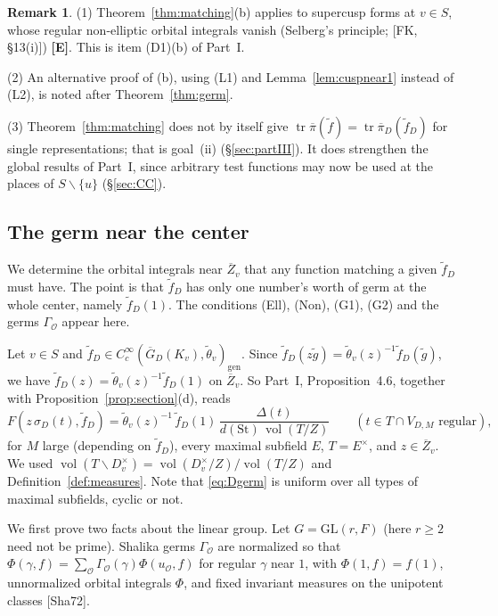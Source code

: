 \documentclass[12pt]{article}
\newcommand{\ov}[1]{\overline{#1}}
\newcommand{\gen}{\mathrm{gen}}
\newcommand{\tr}{\operatorname{tr}}
\newcommand{\vol}{\operatorname{vol}}
\newcommand{\GL}{\mathrm{GL}}
\newcommand{\St}{\mathrm{St}}
\newcommand{\Zb}{\ov{Z}}
\newcommand{\GDb}{\ov{G}_D}
\newcommand{\pib}{\ov{\pi}}
\newcommand{\sg}{\sigma}
\newcommand{\Ev}{\textbf{[E]}}
\theoremstyle{plain}
\theoremstyle{definition}
\newtheorem{remark}[theorem]{Remark}
\begin{document}
\begin{remark}
(1) Theorem~\ref{thm:matching}(b) applies to supercusp forms at $v\in S$, whose regular non-elliptic orbital integrals vanish (Selberg's principle; [FK, \S13(i)]) \Ev. This is item (D1)(b) of Part~I.

(2) An alternative proof of (b), using (L1) and Lemma~\ref{lem:cuspnear1} instead of (L2), is noted after Theorem~\ref{thm:germ}.

(3) Theorem~\ref{thm:matching} does not by itself give $\tr\pib(\tilde f)=\tr\pib_D(\tilde f_D)$ for single representations; that is goal~(ii) (\S\ref{sec:partIII}). It does strengthen the global results of Part~I, since arbitrary test functions may now be used at the places of $S\smallsetminus\{u\}$ (\S\ref{sec:CC}).
\end{remark}


\subsection{The germ near the center}\label{subsec:germ}
We determine the orbital integrals near $\Zb_v$ that any function matching a given $\tilde f_D$ must have. The point is that $\tilde f_D$ has only one number's worth of germ at the whole center, namely $\tilde f_D(1)$. The conditions (Ell), (Non), (G1), (G2) and the germs $\Gamma_{\mathcal O}$ appear here.

Let $v\in S$ and $\tilde f_D\in C_c^\infty(\GDb(K_v),\tilde\theta_v)_\gen$. Since $\tilde f_D(z\tilde g)=\tilde\theta_v(z)^{-1}\tilde f_D(\tilde g)$, we have $\tilde f_D(z)=\tilde\theta_v(z)^{-1}\tilde f_D(1)$ on $\Zb_v$. So Part~I, Proposition~4.6, together with Proposition~\ref{prop:section}(d), reads
\begin{equation}\label{eq:Dgerm}
F(z\,\sg_D(t),\tilde f_D)=\tilde\theta_v(z)^{-1}\,\tilde f_D(1)\,\frac{\Delta(t)}{d(\St)\,\vol(T/Z)}\qquad(t\in T\cap V_{D,M}\text{ regular}),
\end{equation}
for $M$ large (depending on $\tilde f_D$), every maximal subfield $E$, $T=E^\times$, and $z\in\Zb_v$. We used $\vol(T\backslash D_v^\times)=\vol(D_v^\times/Z)/\vol(T/Z)$ and Definition~\ref{def:measures}. Note that \eqref{eq:Dgerm} is uniform over all types of maximal subfields, cyclic or not.


We first prove two facts about the linear group. Let $G=\GL(r,F)$ (here $r\ge2$ need not be prime). Shalika germs $\Gamma_{\mathcal O}$ are normalized so that $\Phi(\gamma,f)=\sum_{\mathcal O}\Gamma_{\mathcal O}(\gamma)\Phi(u_{\mathcal O},f)$ for regular $\gamma$ near $1$, with $\Phi(1,f)=f(1)$, unnormalized orbital integrals $\Phi$, and fixed invariant measures on the unipotent classes [Sha72].
\end{document}
